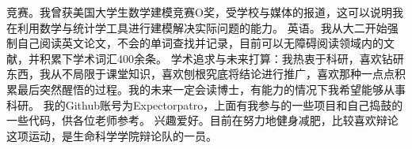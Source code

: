 竞赛。我曾获美国大学生数学建模竞赛O奖，受学校与媒体的报道，这可以说明我在利用数学与统计学工具进行建模解决实际问题的能力。
英语。我从大二开始强制自己阅读英文论文，不会的单词查找并记录，目前可以无障碍阅读领域内的文献，并积累下学术词汇400余条。
学术追求与未来打算：我热衷于科研，喜欢钻研东西，我从不局限于课堂知识，喜欢刨根究底将结论进行推广，喜欢那种一点点积累最后突然醒悟的过程。我的未来一定会读博士，有能力的情况下我希望能够从事科研。
我的Github账号为Expectorpatro，上面有我参与的一些项目和自己捣鼓的一些代码，供各位老师参考。
兴趣爱好。目前在努力地健身减肥，比较喜欢辩论这项运动，是生命科学学院辩论队的一员。